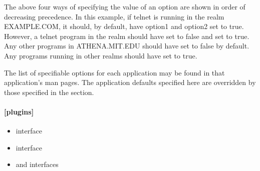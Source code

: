 \documentclass[letterpaper,10pt,english]{sphinxmanual}
\begin{document}
%
\begin{sphinxVerbatim}[commandchars=\\\{\}]
\PYG{p}{[}\PYG{p}{]}
      
          
              
      
          
          
      
          
      
\end{sphinxVerbatim}

The above four ways of specifying the value of an option are shown in
order of decreasing precedence. In this example, if telnet is running
in the realm EXAMPLE.COM, it should, by default, have option1 and
option2 set to true.  However, a telnet program in the realm
 should have  set to false and
 set to true.  Any other programs in ATHENA.MIT.EDU should
have  set to false by default.  Any programs running in
other realms should have  set to true.

The list of specifiable options for each application may be found in
that application’s man pages.  The application defaults specified here
are overridden by those specified in the {\hyperref[\detokenize{admin/conf_files/krb5_conf:realms}]{}} section.


\paragraph{{[}plugins{]}}
\label{\detokenize{admin/conf_files/krb5_conf:id6}}\label{\detokenize{admin/conf_files/krb5_conf:plugins}}\begin{itemize}
\item {} 
{\hyperref[\detokenize{admin/conf_files/krb5_conf:pwqual}]{}} interface

\item {} 
{\hyperref[\detokenize{admin/conf_files/krb5_conf:kadm5-hook}]{}} interface

\item {} 
{\hyperref[\detokenize{admin/conf_files/krb5_conf:clpreauth}]{}} and {\hyperref[\detokenize{admin/conf_files/krb5_conf:kdcpreauth}]{}} interfaces

\end{itemize}
\end{document}
